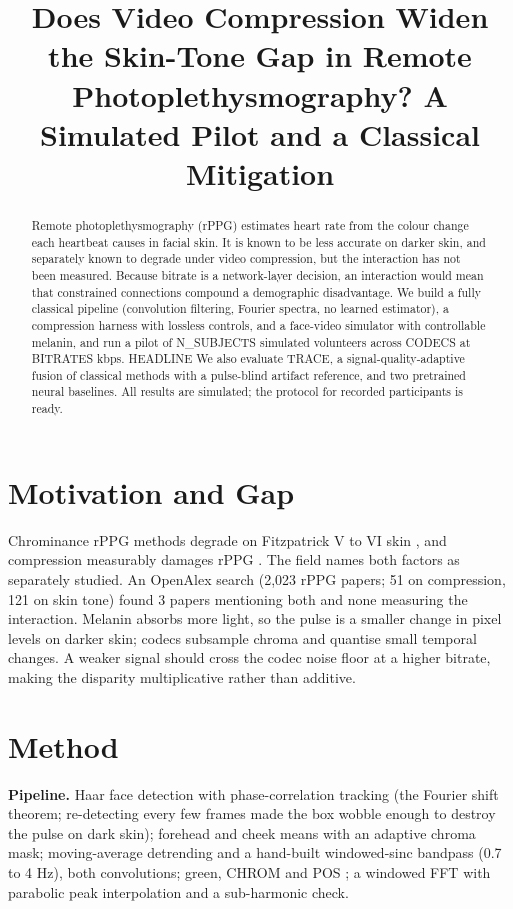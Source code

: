 \documentclass[conference]{IEEEtran}
\begin{document}
\title{Does Video Compression Widen the Skin-Tone Gap in Remote Photoplethysmography? A Simulated Pilot and a Classical Mitigation}

\author{
}

\maketitle

\begin{abstract}
Remote photoplethysmography (rPPG) estimates heart rate from the colour change each heartbeat causes in facial skin. It is known to be less accurate on darker skin, and separately known to degrade under video compression, but the interaction has not been measured. Because bitrate is a network-layer decision, an interaction would mean that constrained connections compound a demographic disadvantage. We build a fully classical pipeline (convolution filtering, Fourier spectra, no learned estimator), a compression harness with lossless controls, and a face-video simulator with controllable melanin, and run a pilot of {{N_SUBJECTS}} simulated volunteers across {{CODECS}} at {{BITRATES}} kbps. {{HEADLINE}} We also evaluate TRACE, a signal-quality-adaptive fusion of classical methods with a pulse-blind artifact reference, and two pretrained neural baselines. All results are simulated; the protocol for recorded participants is ready.
\end{abstract}

\section{Motivation and Gap}
Chrominance rPPG methods degrade on Fitzpatrick V to VI skin \cite{dasari2021,nowara2020}, and compression measurably damages rPPG \cite{mcduff2017,nowara2019}. The field names both factors as separately studied. An OpenAlex search (2,023 rPPG papers; 51 on compression, 121 on skin tone) found 3 papers mentioning both and none measuring the interaction. Melanin absorbs more light, so the pulse is a smaller change in pixel levels on darker skin; codecs subsample chroma and quantise small temporal changes. A weaker signal should cross the codec noise floor at a higher bitrate, making the disparity multiplicative rather than additive.

\section{Method}
\textbf{Pipeline.} Haar face detection with phase-correlation tracking (the Fourier shift theorem; re-detecting every few frames made the box wobble enough to destroy the pulse on dark skin); forehead and cheek means with an adaptive chroma mask; moving-average detrending and a hand-built windowed-sinc bandpass (0.7 to 4 Hz), both convolutions; green, CHROM \cite{dehaan2013} and POS \cite{wang2017}; a windowed FFT with parabolic peak interpolation and a sub-harmonic check.
\end{document}
